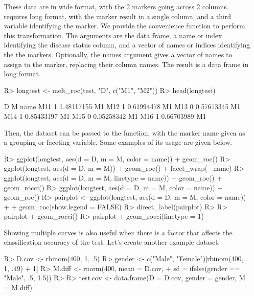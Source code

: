 \documentclass[codesnippet]{jss}
\begin{document}
These data are in wide format, with the 2 markers going across 2
columns.  requires long format, with the marker result in a
single column, and a third variable identifying the marker. We provide
the convenience function  to perform this transformation.
The arguments are the data frame, a name or index identifying the
disease status column, and a vector of names or indices identifying the
the markers. Optionally, the names argument gives a vector of names to
assign to the marker, replacing their column names. The result is a data
frame in long format.

\begin{Schunk}
\begin{Sinput}
R> longtest <- melt_roc(test, "D", c("M1", "M2"))
R> head(longtest)
\end{Sinput}
\begin{Soutput}
    D          M name
M11 1 1.48117155   M1
M12 1 0.61994478   M1
M13 0 0.57613345   M1
M14 1 0.85433197   M1
M15 0 0.05258342   M1
M16 1 0.66703989   M1
\end{Soutput}
\end{Schunk}

Then, the dataset can be passed to the  function, with the
marker name given as a grouping or faceting variable. Some examples of
its usage are given below.

\begin{Schunk}
\begin{Sinput}
R> ggplot(longtest, aes(d = D, m = M, color = name)) + geom_roc()
R> ggplot(longtest, aes(d = D, m = M)) + geom_roc() + facet_wrap(~ name)
R> ggplot(longtest, aes(d = D, m = M, linetype = name)) + geom_roc() + geom_rocci()
R> ggplot(longtest, aes(d = D, m = M, color = name)) + geom_roc() 
R> pairplot <- ggplot(longtest, aes(d = D, m = M, color = name)) + 
+   geom_roc(show.legend = FALSE)
R> direct_label(pairplot)
R> 
R> pairplot + geom_rocci()
R> pairplot + geom_rocci(linetype = 1)
\end{Sinput}
\end{Schunk}

Showing multiple curves is also useful when there is a factor that
affects the classification accuracy of the test. Let's create another
example dataset.

\begin{Schunk}
\begin{Sinput}
R> D.cov <- rbinom(400, 1, .5)
R> gender <- c("Male", "Female")[rbinom(400, 1, .49) + 1]
R> M.diff <- rnorm(400, mean = D.cov, 
+                 sd = ifelse(gender == "Male", .5, 1.5))
R> 
R> test.cov <- data.frame(D = D.cov, gender = gender, M = M.diff)
\end{Sinput}
\end{Schunk}
\end{document}
